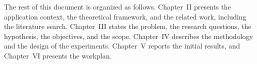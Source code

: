 The rest of this document is organized as follows. Chapter~II presents the application context, the theoretical framework, and the related work, including the literature search. Chapter~III states the problem, the research questions, the hypothesis, the objectives, and the scope. Chapter~IV describes the methodology and the design of the experiments. Chapter~V reports the initial results, and Chapter~VI presents the workplan.
